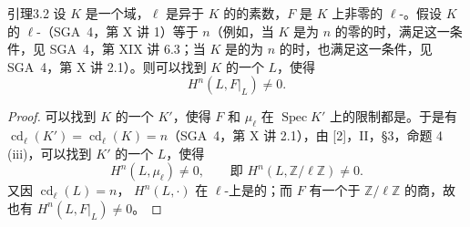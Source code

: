 \begin{SGAresult}{引理}{3.2}
设 $K$ 是一个域，$\ell$ 是异于 $K$ 的的素数，$F$ 是 $K$ 上非零的 $\ell$-。假设 $K$ 的 $\ell$-（SGA~4，第 X 讲 1）等于 $n$（例如，当 $K$ 是为 $n$ 的零的时，满足这一条件，见 SGA~4，第 XIX 讲 6.3；当 $K$ 是的为 $n$ 的时，也满足这一条件，见 SGA~4，第 X 讲 2.1）。则可以找到 $K$ 的一个 $L$，使得
\[
H^n(L,F|_L)\ne0.
\]
\end{SGAresult}
\begin{proof}
可以找到 $K$ 的一个 $K'$，使得 $F$ 和 $\mu_\ell$ 在 $\operatorname{Spec}K'$ 上的限制都是。于是有 $\operatorname{cd}_\ell(K')=\operatorname{cd}_\ell(K)=n$（SGA~4，第 X 讲 2.1），由 [2]，II，\S3，命题 4 (iii)，可以找到 $K'$ 的一个 $L$，使得
\[
H^n(L,\mu_\ell)\ne0,\qquad\text{即 }H^n(L,\mathbb Z/\ell\mathbb Z)\ne0.
\]
又因 $\operatorname{cd}_\ell(L)=n$， $H^n(L,\cdot)$ 在 $\ell$-上是的；而 $F$ 有一个于 $\mathbb Z/\ell\mathbb Z$ 的商，故也有 $H^n(L,F|_L)\ne0$。
\end{proof}

